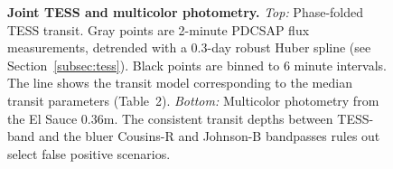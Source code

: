 \documentclass[12pt,twocolumn,tighten]{aastex63}
\begin{document}
\begin{figure}[!t]
	\begin{center}
		\leavevmode
		
		\vspace{-0.5cm}
	\end{center}
	\vspace{-0.7cm}
  \caption{
    {\bf Joint TESS and multicolor photometry.} {\it Top:}
    Phase-folded TESS transit. Gray points are 2-minute PDCSAP flux
    measurements, detrended with a 0.3-day robust Huber spline (see
    Section~\ref{subsec:tess}).  Black points are binned to 6 minute
    intervals.  The line shows the transit model corresponding to the
    median transit parameters (Table~2).  {\it Bottom:} Multicolor
    photometry from the El Sauce 0.36m.  The consistent transit depths
    between TESS-band and the bluer Cousins-R and Johnson-B bandpasses
    rules out select false positive scenarios.
    \label{fig:jointphot}
	}
\end{figure}
\end{document}
